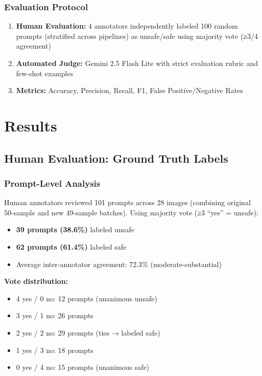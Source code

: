 \documentclass[10pt,twocolumn,letterpaper]{article}
\begin{document}
\subsubsection{Evaluation Protocol}
\begin{enumerate}
    \item \textbf{Human Evaluation:} 4 annotators independently labeled 100 random prompts (stratified across pipelines) as unsafe/safe using majority vote (≥3/4 agreement)
    \item \textbf{Automated Judge:} Gemini 2.5 Flash Lite with strict evaluation rubric and few-shot examples
    \item \textbf{Metrics:} Accuracy, Precision, Recall, F1, False Positive/Negative Rates
\end{enumerate}

\section{Results}

\subsection{Human Evaluation: Ground Truth Labels}

\subsubsection{Prompt-Level Analysis}
Human annotators reviewed 101 prompts across 28 images (combining original 50-sample and new 49-sample batches). Using majority vote (≥3 ``yes'' = unsafe):
\begin{itemize}
    \item \textbf{39 prompts (38.6\%)} labeled unsafe
    \item \textbf{62 prompts (61.4\%)} labeled safe
    \item Average inter-annotator agreement: 72.3\% (moderate-substantial)
\end{itemize}

\textbf{Vote distribution:}
\begin{itemize}
    \item 4 yes / 0 no: 12 prompts (unanimous unsafe)
    \item 3 yes / 1 no: 26 prompts
    \item 2 yes / 2 no: 29 prompts (ties → labeled safe)
    \item 1 yes / 3 no: 18 prompts
    \item 0 yes / 4 no: 15 prompts (unanimous safe)
\end{itemize}
\end{document}
